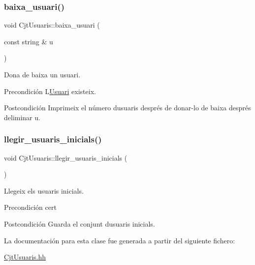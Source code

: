 \subsubsection{\texorpdfstring{baixa\+\_\+usuari()}{baixa\_usuari()}}
{\footnotesize\ttfamily void Cjt\+Usuaris\+::baixa\+\_\+usuari (\begin{DoxyParamCaption}\item[{const string \&}]{u }\end{DoxyParamCaption})}



Dona de baixa un usuari. 

\begin{DoxyPrecond}{Precondición}
L\textquotesingle{}\mbox{\hyperlink{class_usuari}{Usuari}} existeix. 
\end{DoxyPrecond}
\begin{DoxyPostcond}{Postcondición}
Imprimeix el número d\textquotesingle{}usuaris després de donar-\/lo de baixa després d\textquotesingle{}eliminar u. 
\end{DoxyPostcond}
\mbox{\label{class_cjt_usuaris_acb8d525b500b034d277c48197d16a682}} 
\subsubsection{\texorpdfstring{llegir\+\_\+usuaris\+\_\+inicials()}{llegir\_usuaris\_inicials()}}
{\footnotesize\ttfamily void Cjt\+Usuaris\+::llegir\+\_\+usuaris\+\_\+inicials (\begin{DoxyParamCaption}{ }\end{DoxyParamCaption})}



Llegeix els usuaris inicials. 

\begin{DoxyPrecond}{Precondición}
cert 
\end{DoxyPrecond}
\begin{DoxyPostcond}{Postcondición}
Guarda el conjunt d\textquotesingle{}usuaris inicials. 
\end{DoxyPostcond}


La documentación para esta clase fue generada a partir del siguiente fichero\+:\begin{DoxyCompactItemize}
\item 
\mbox{\hyperlink{_cjt_usuaris_8hh}{Cjt\+Usuaris.\+hh}}\end{DoxyCompactItemize}
